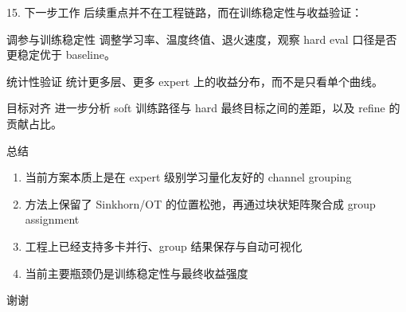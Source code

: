 \documentclass[aspectratio=169,professionalfonts]{ctexbeamer}
\begin{document}
\begin{frame}{15. 下一步工作}
  后续重点并不在工程链路，而在训练稳定性与收益验证：

  \vspace{0.4em}
  \begin{block}{调参与训练稳定性}
    调整学习率、温度终值、退火速度，观察 hard eval 口径是否更稳定优于 baseline。
  \end{block}

  \begin{block}{统计性验证}
    统计更多层、更多 expert 上的收益分布，而不是只看单个曲线。
  \end{block}

  \begin{block}{目标对齐}
    进一步分析 soft 训练路径与 hard 最终目标之间的差距，以及 refine 的贡献占比。
  \end{block}
\end{frame}

\begin{frame}{总结}
  \begin{enumerate}
    \item 当前方案本质上是在 expert 级别学习量化友好的 channel grouping
    \item 方法上保留了 Sinkhorn/OT 的位置松弛，再通过块状矩阵聚合成 group assignment
    \item 工程上已经支持多卡并行、group 结果保存与自动可视化
    \item 当前主要瓶颈仍是训练稳定性与最终收益强度
  \end{enumerate}
\end{frame}

\begin{frame}
  \centering
  {\LARGE 谢谢}
\end{frame}
\end{document}

